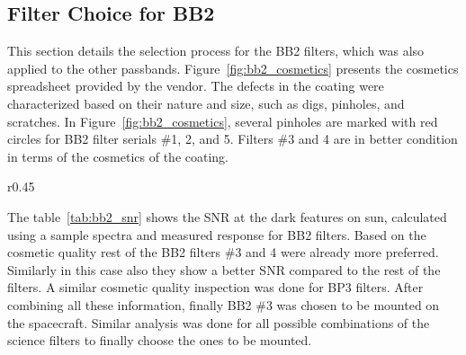 \subsection{Filter Choice for BB2}

This section details the selection process for the BB2 filters, which was also applied to the other passbands. Figure~\ref{fig:bb2_cosmetics} presents the cosmetics spreadsheet provided by the vendor. The defects in the coating were characterized based on their nature and size, such as digs, pinholes, and scratches. In Figure~\ref{fig:bb2_cosmetics}, several pinholes are marked with red circles for BB2 filter serials \#1, 2, and 5. Filters \#3 and 4 are in better condition in terms of the cosmetics of the coating.

\begin{wrapfigure}{r}{0.45\textwidth}
    \centering
    \vspace{-20pt} %
    \label{tab:bb2_snr}
    \vspace{-10pt} %
\end{wrapfigure}

The table~\ref{tab:bb2_snr} shows the SNR at the dark features on sun, calculated using a sample spectra and measured response for BB2 filters. Based on the cosmetic quality rest of the BB2 filters \#3 and 4 were already more preferred. Similarly in this case also they show a better SNR compared to the rest of the filters. A similar cosmetic quality inspection was done for BP3 filters. After combining all these information, finally BB2 \#3 was chosen to be mounted on the spacecraft. Similar analysis was done for all possible combinations of the science filters to finally choose the ones to be mounted. 

